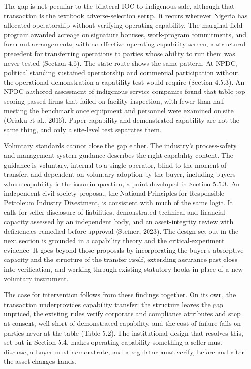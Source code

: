 The gap is not peculiar to the bilateral IOC-to-indigenous sale,
although that transaction is the textbook adverse-selection setup. It
recurs wherever Nigeria has allocated operatorship without verifying
operating capability. The marginal field program awarded acreage on
signature bonuses, work-program commitments, and farm-out arrangements,
with no effective operating-capability screen, a structural precedent
for transferring operations to parties whose ability to run them was
never tested (Section 4.6). The state route shows the same pattern. At
NPDC, political standing sustained operatorship and commercial
participation without the operational demonstration a capability test
would require (Section 4.5.3). An NPDC-authored assessment of indigenous
service companies found that table-top scoring passed firms that failed
on facility inspection, with fewer than half meeting the benchmark once
equipment and personnel were examined on site (Oriaku et al., 2016).
Paper capability and demonstrated capability are not the same thing, and
only a site-level test separates them.

Voluntary standards cannot close the gap either. The industry's
process-safety and management-system guidance describes the right
capability content. The guidance is voluntary, internal to a single
operator, blind to the moment of transfer, and dependent on voluntary
adoption by the buyer, including buyers whose capability is the issue in
question, a point developed in Section 5.5.3. An independent
civil-society proposal, the National Principles for Responsible
Petroleum Industry Divestment, is consistent with much of the same
logic. It calls for seller disclosure of liabilities, demonstrated
technical and financial capacity assessed by an independent body, and an
asset-integrity review with deficiencies remedied before approval
(Steiner, 2023). The design set out in the next section is grounded in a
capability theory and the critical-experiment evidence. It goes beyond
those proposals by incorporating the buyer's absorptive capacity and the
structure of the transfer itself, extending assurance past close into
verification, and working through existing statutory hooks in place of a
new voluntary instrument.

The case for intervention follows from these findings together. On its
own, the transaction underprovides capability transfer: the structure
leaves the gap unpriced, the existing rules verify corporate and
compliance attributes and stop at consent, well short of demonstrated
capability, and the cost of failure falls on parties never at the table
(Table 5.2). The institutional design that resolves this, set out in
Section 5.4, makes operating capability something a seller must
disclose, a buyer must demonstrate, and a regulator must verify, before
and after the asset changes hands.

